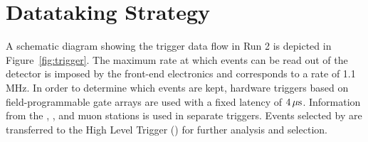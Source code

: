 \section{Datataking Strategy}

A schematic diagram showing the trigger data flow in Run 2 is depicted
in Figure~\ref{fig:trigger}.  The maximum rate at which events can be
read out of the detector is imposed by the front-end electronics and
corresponds to a rate of 1.1\,MHz. In order to determine which events
are kept, hardware triggers based on field-programmable gate arrays
are used with a fixed latency of $4\,\mu {\rm s}$. Information from
the \ecal, \hcal, and muon stations is used in separate \lz
triggers. Events selected by \lz are transferred to the High Level
Trigger (\hlt) for further analysis and selection.

